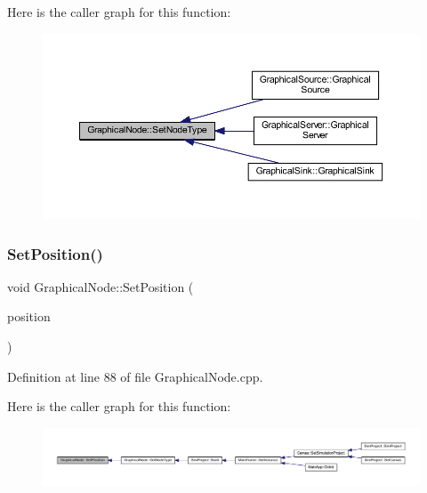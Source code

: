 Here is the caller graph for this function\+:
\nopagebreak
\begin{figure}[H]
\begin{center}
\leavevmode
\includegraphics[width=350pt]{class_graphical_node_a2be01228b0d5b17f1d14038aeee25619_icgraph}
\end{center}
\end{figure}
\mbox{\label{class_graphical_node_a61cb6a7d32ae7db370336639d83fc2bd}} 
\subsubsection{\texorpdfstring{Set\+Position()}{SetPosition()}}
{\footnotesize\ttfamily void Graphical\+Node\+::\+Set\+Position (\begin{DoxyParamCaption}\item[{const wx\+Point2\+D\+Double \&}]{position }\end{DoxyParamCaption})}



Definition at line 88 of file Graphical\+Node.\+cpp.

Here is the caller graph for this function\+:
\nopagebreak
\begin{figure}[H]
\begin{center}
\leavevmode
\includegraphics[width=350pt]{class_graphical_node_a61cb6a7d32ae7db370336639d83fc2bd_icgraph}
\end{center}
\end{figure}
\mbox{\label{class_graphical_node_ad165a0c444192d4c7ff6a07c62972dab}} 
